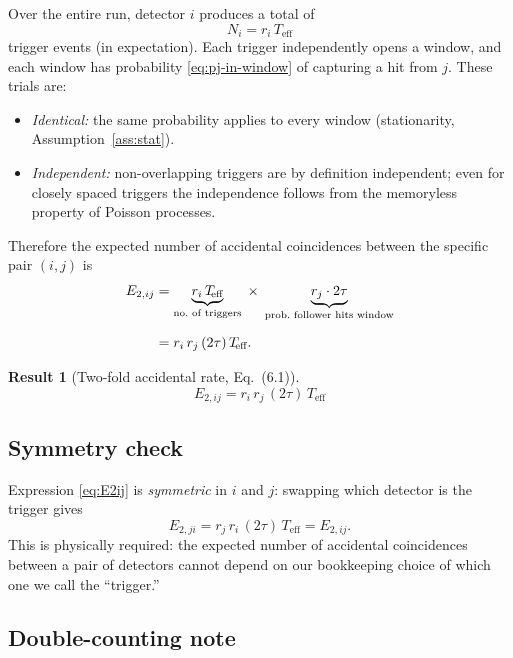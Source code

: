 \documentclass[12pt]{article}
\theoremstyle{definition}
\newtheorem{result}{Result}
\newcommand{\Teff}{T_{\!\text{eff}}}
\newcommand{\Eacc}[1]{E_{#1}}
\begin{document}
Over the entire run, detector $i$ produces a total of
\begin{equation}
    N_i = r_i\,\Teff
    \label{eq:num-triggers}
\end{equation}
trigger events (in expectation).  Each trigger independently opens a
window, and each window has probability \eqref{eq:pj-in-window} of
capturing a hit from $j$.  These trials are:
\begin{itemize}
    \item \textit{Identical:} the same probability applies to every
          window (stationarity, Assumption~\ref{ass:stat}).
    \item \textit{Independent:} non-overlapping triggers are by
          definition independent; even for closely spaced triggers the
          independence follows from the memoryless property of Poisson
          processes.
\end{itemize}
Therefore the expected number of accidental coincidences between the
specific pair $(i, j)$ is
\begin{align}
    \Eacc{2,ij}
        &= \underbrace{r_i\,\Teff}_{\text{no.\ of triggers}}
           \;\times\;
           \underbrace{r_j\cdot 2\tau}_{\text{prob.\ follower hits window}}
           \notag \\[6pt]
        &= r_i\,r_j\,(2\tau)\,\Teff.
        \label{eq:E2ij}
\end{align}

\begin{result}[Two-fold accidental rate, Eq.\ (6.1)]
\begin{equation}
    \boxed{
        \Eacc{2,ij} = r_i\,r_j\,(2\tau)\,\Teff
    }
    \tag{6.1}
\end{equation}
\end{result}

\subsection{Symmetry check}

Expression \eqref{eq:E2ij} is \emph{symmetric} in $i$ and $j$:
swapping which detector is the trigger gives
\[
    \Eacc{2,ji} = r_j\,r_i\,(2\tau)\,\Teff = \Eacc{2,ij}.
\]
This is physically required: the expected number of accidental
coincidences between a pair of detectors cannot depend on our bookkeeping
choice of which one we call the ``trigger.''

\subsection{Double-counting note}
\end{document}
